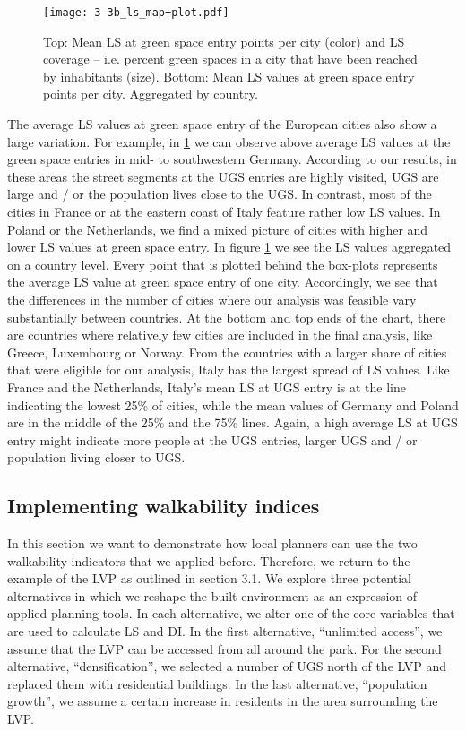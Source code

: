 \documentclass[10pt]{article}
\begin{document}
\begin{figure}
\centering
\texttt{[image: 3-3b\_ls\_map+plot.pdf]}
\caption{Top: Mean LS at green space entry points per city (color) and LS coverage – i.e. percent green spaces in a city that have been reached by inhabitants (size). Bottom: Mean LS values at green space entry points per city. Aggregated by country.}
\label{fig:lsmap}
\end{figure}

The average LS values at green space entry of the European cities also show a large variation.
For example, in \ref{fig:lsmap} we can observe above average LS values at the green space entries in mid- to southwestern Germany.
According to our results, in these areas the street segments at the UGS entries are highly visited, UGS are large and / or the population lives close to the UGS. 
In contrast, most of the cities in France or at the eastern coast of Italy feature rather low LS values.  
In Poland or the Netherlands, we find a mixed picture of cities with higher and lower LS values at green space entry.
In figure \ref{fig:lsmap} we see the LS values aggregated on a country level. 
Every point that is plotted behind the box-plots represents the average LS value at green space entry of one city.
Accordingly, we see that the differences in the number of cities where our analysis was feasible vary substantially between countries.
At the bottom and top ends of the chart, there are countries where relatively few cities are included in the final analysis, like Greece, Luxembourg or Norway.
From the countries with a larger share of cities that were eligible for our analysis, Italy has the largest spread of LS values.
Like France and the Netherlands, Italy’s mean LS at UGS entry is at the line indicating the lowest 25\% of cities, while the mean values of Germany and Poland are in the middle of the 25\% and the 75\% lines.
Again, a high average LS at UGS entry might indicate more people at the UGS entries, larger UGS and / or population living closer to UGS.


\subsection{Implementing walkability indices}
In this section we want to demonstrate how local planners can use the two walkability indicators that we applied before.
Therefore, we return to the example of the LVP as outlined in section 3.1.
We explore three potential alternatives in which we reshape the built environment as an expression of applied planning tools.
In each alternative, we alter one of the core variables that are used to calculate LS and DI.
In the first alternative, “unlimited access”, we assume that the LVP can be accessed from all around the park.
For the second alternative, “densification”, we selected a number of UGS north of the LVP and replaced them with residential buildings.
In the last alternative, “population growth”, we assume a certain increase in residents in the area surrounding the LVP.
\end{document}
